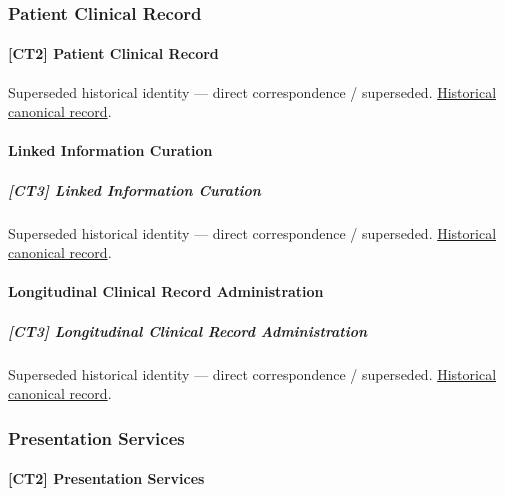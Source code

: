 \subsubsection{Patient Clinical Record}

\paragraph{[CT2] Patient Clinical Record}

\par\label{element:2e4de521bda24ad7b0ea64ae535b7f84}
Superseded historical identity — direct correspondence / superseded. \href{../../../../continuum/strategy/capability/2e4de521bda24ad7b0ea64ae535b7f84.md}{Historical canonical record}.\par

\paragraph{Linked Information Curation}

\subparagraph{[CT3] Linked Information Curation}

\par\label{element:9d0925bb39664a5985cacf3cea7442d1}
Superseded historical identity — direct correspondence / superseded. \href{../../../../continuum/strategy/capability/9d0925bb39664a5985cacf3cea7442d1.md}{Historical canonical record}.\par

\paragraph{Longitudinal Clinical Record Administration}

\subparagraph{[CT3] Longitudinal Clinical Record Administration}

\par\label{element:bd91d848cf424c42bec7c80cd32edd28}
Superseded historical identity — direct correspondence / superseded. \href{../../../../continuum/strategy/capability/bd91d848cf424c42bec7c80cd32edd28.md}{Historical canonical record}.\par

\subsubsection{Presentation Services}

\paragraph{[CT2] Presentation Services}

